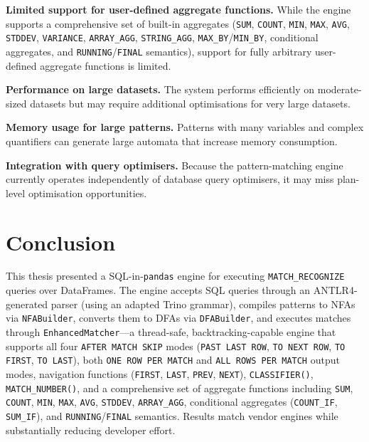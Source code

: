 \textbf{Limited support for user-defined aggregate functions.}
While the engine supports a comprehensive set of built-in aggregates
(\texttt{SUM}, \texttt{COUNT}, \texttt{MIN}, \texttt{MAX},
\texttt{AVG}, \texttt{STDDEV}, \texttt{VARIANCE}, \texttt{ARRAY\_AGG},
\texttt{STRING\_AGG}, \texttt{MAX\_BY}/\texttt{MIN\_BY}, conditional
aggregates, and \texttt{RUNNING}/\texttt{FINAL} semantics), support
for fully arbitrary user-defined aggregate functions is limited.

\textbf{Performance on large datasets.}
The system performs efficiently on moderate-sized datasets but may
require additional optimisations for very large datasets.

\textbf{Memory usage for large patterns.}
Patterns with many variables and complex quantifiers can generate
large automata that increase memory consumption.

\textbf{Integration with query optimisers.}
Because the pattern-matching engine currently operates independently of
database query optimisers, it may miss plan-level optimisation
opportunities.

\section{Conclusion}
\label{sec:conclusion}

This thesis presented a SQL-in-\texttt{pandas} engine for executing
\texttt{MATCH\_RECOGNIZE} queries over DataFrames.  The engine accepts
SQL queries through an ANTLR4-generated parser (using an adapted Trino
grammar), compiles patterns to NFAs via \texttt{NFABuilder}, converts
them to DFAs via \texttt{DFABuilder}, and executes matches through
\texttt{EnhancedMatcher}---a thread-safe, backtracking-capable engine
that supports all four \texttt{AFTER MATCH SKIP} modes
(\texttt{PAST LAST ROW}, \texttt{TO NEXT ROW}, \texttt{TO FIRST},
\texttt{TO LAST}), both \texttt{ONE ROW PER MATCH} and
\texttt{ALL ROWS PER MATCH} output modes, navigation functions
(\texttt{FIRST}, \texttt{LAST}, \texttt{PREV}, \texttt{NEXT}),
\texttt{CLASSIFIER()}, \texttt{MATCH\_NUMBER()}, and a comprehensive
set of aggregate functions including \texttt{SUM}, \texttt{COUNT},
\texttt{MIN}, \texttt{MAX}, \texttt{AVG}, \texttt{STDDEV},
\texttt{ARRAY\_AGG}, conditional aggregates (\texttt{COUNT\_IF},
\texttt{SUM\_IF}), and \texttt{RUNNING}/\texttt{FINAL} semantics.
Results match vendor engines while substantially reducing developer effort.

